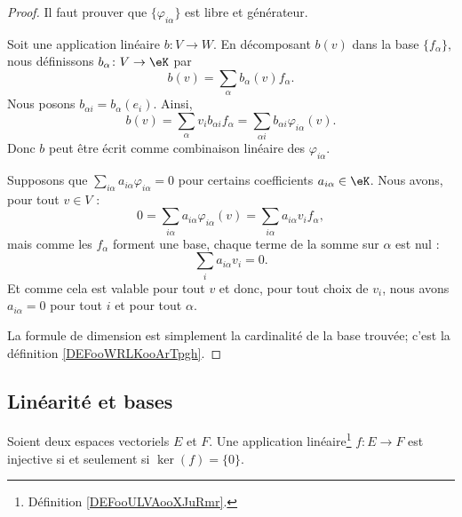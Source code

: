 \begin{proof}
	Il faut prouver que \( \{\varphi_{i\alpha}\}\) est libre et générateur.

	\begin{subproof}
		\spitem[Générateur]
		Soit une application linéaire \( b\colon V\to W\). En décomposant \( b(v)\) dans la base \( \{f_{\alpha}\}\), nous définissons \( b_{\alpha}\colon V\to \eK\) par
		\begin{equation}
			b(v)=\sum_{\alpha}b_{\alpha}(v)f_{\alpha}.
		\end{equation}
		Nous posons \( b_{\alpha i}=b_{\alpha}(e_i)\). Ainsi,
		\begin{equation}
			b(v)=\sum_{\alpha}v_ib_{\alpha i}f_{\alpha}=\sum_{\alpha i}b_{\alpha i}\varphi_{i\alpha}(v).
		\end{equation}
		Donc \( b\) peut être écrit comme combinaison linéaire des \( \varphi_{i\alpha}\).

		\spitem[Libre]
		Supposons que \( \sum_{i\alpha}a_{i\alpha}\varphi_{i\alpha}=0\) pour certains coefficients \( a_{i\alpha}\in \eK\). Nous avons, pour tout \( v\in V\) :
		\begin{equation}
			0=\sum_{i\alpha}a_{i\alpha}\varphi_{i\alpha}(v)=\sum_{i\alpha}a_{i\alpha}v_if_{\alpha},
		\end{equation}
		mais comme les \( f_{\alpha}\) forment une base, chaque terme de la somme sur \( \alpha\) est nul :
		\begin{equation}
			\sum_ia_{i\alpha}v_i=0.
		\end{equation}
		Et comme cela est valable pour tout \( v\) et donc, pour tout choix de \( v_i\), nous avons \( a_{i\alpha}=0\) pour tout \( i\) et pour tout \( \alpha\).
	\end{subproof}
	La formule de dimension est simplement la cardinalité de la base trouvée; c'est la définition \ref{DEFooWRLKooArTpgh}.
\end{proof}

\subsection{Linéarité et bases}

\begin{proposition}
	Soient deux espaces vectoriels \( E\) et \( F\). Une application linéaire\footnote{Définition \ref{DEFooULVAooXJuRmr}.} \( f\colon E\to F\) est injective si et seulement si \( \ker(f)=\{ 0 \}\).
\end{proposition}

